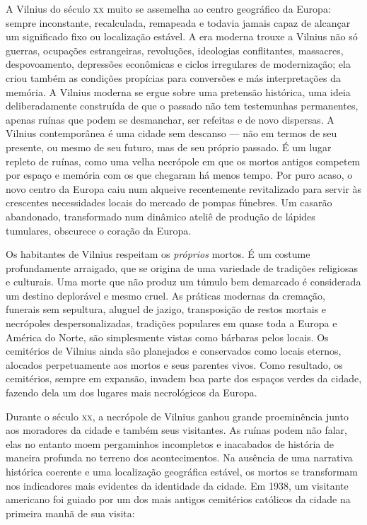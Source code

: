 A Vilnius do século \textsc{xx} muito se assemelha ao centro geográfico da
Europa: sempre inconstante, recalculada, remapeada e todavia jamais
capaz de alcançar um significado fixo ou localização estável. A era
moderna trouxe a Vilnius não só guerras, ocupações estrangeiras,
revoluções, ideologias conflitantes, massacres, despovoamento,
depressões econômicas e ciclos irregulares de modernização; ela criou
também as condições propícias para conversões e más interpretações da
memória. A Vilnius moderna se ergue sobre uma pretensão histórica, uma
ideia deliberadamente construída de que o passado não tem testemunhas
permanentes, apenas ruínas que podem se desmanchar, ser refeitas e de
novo dispersas. A Vilnius contemporânea é uma cidade sem descanso --- não
em termos de seu presente, ou mesmo de seu futuro, mas de seu próprio
passado. É um lugar repleto de ruínas, como uma velha necrópole em que
os mortos antigos competem por espaço e memória com os que chegaram há
menos tempo. Por puro acaso, o novo centro da Europa caiu num alqueive
recentemente revitalizado para servir às crescentes necessidades locais
do mercado de pompas fúnebres. Um casarão abandonado, transformado num
dinâmico ateliê de produção de lápides tumulares, obscurece o coração da
Europa.

Os habitantes de Vilnius respeitam os \textit{próprios} mortos. É um
costume profundamente arraigado, que se origina de uma variedade de
tradições religiosas e culturais. Uma morte que não produz um túmulo bem
demarcado é considerada um destino deplorável e mesmo cruel. As práticas
modernas da cremação, funerais sem sepultura, aluguel de jazigo,
transposição de restos mortais e necrópoles despersonalizadas, tradições
populares em quase toda a Europa e América do Norte, são simplesmente
vistas como bárbaras pelos locais. Os cemitérios de Vilnius ainda são
planejados e conservados como locais eternos, alocados perpetuamente aos
mortos e seus parentes vivos. Como resultado, os cemitérios, sempre em
expansão, invadem boa parte dos espaços verdes da cidade, fazendo dela
um dos lugares mais necrológicos da Europa.

Durante o século \textsc{xx}, a necrópole de Vilnius ganhou grande proeminência
junto aos moradores da cidade e também seus visitantes. As ruínas podem
não falar, elas no entanto moem pergaminhos incompletos e inacabados de
história de maneira profunda no terreno dos acontecimentos. Na ausência
de uma narrativa histórica coerente e uma localização geográfica
estável, os mortos se transformam nos indicadores mais evidentes da
identidade da cidade. Em 1938, um visitante americano foi guiado por um
dos mais antigos cemitérios católicos da cidade na primeira manhã de sua
visita:

